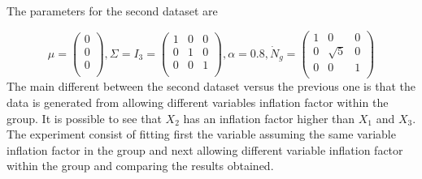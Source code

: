 \documentclass[
]{article}
\newenvironment{Shaded}{\begin{snugshade}}{\end{snugshade}}
\newcommand{\AttributeTok}[1]{\textcolor[rgb]{0.77,0.63,0.00}{#1}}
\newcommand{\CommentTok}[1]{\textcolor[rgb]{0.56,0.35,0.01}{\textit{#1}}}
\newcommand{\ControlFlowTok}[1]{\textcolor[rgb]{0.13,0.29,0.53}{\textbf{#1}}}
\newcommand{\DecValTok}[1]{\textcolor[rgb]{0.00,0.00,0.81}{#1}}
\newcommand{\FunctionTok}[1]{\textcolor[rgb]{0.00,0.00,0.00}{#1}}
\newcommand{\NormalTok}[1]{#1}
\newcommand{\SpecialCharTok}[1]{\textcolor[rgb]{0.00,0.00,0.00}{#1}}
\newcommand{\StringTok}[1]{\textcolor[rgb]{0.31,0.60,0.02}{#1}}
\begin{document}
The parameters for the second dataset are

\[
\mu = \begin{pmatrix} 0 \\ 0 \\ 0\\  \end{pmatrix} , \Sigma = I_{3} = \begin{pmatrix} 1 & 0 & 0  \\ 0 & 1 & 0  \\ 0 & 0 & 1   \\ \end{pmatrix}, \alpha = 0.8, \dot{N}_{g} = \begin{pmatrix} 1 & 0 & 0 \\ 0 & \sqrt{5} & 0  \\ 0 & 0 & 1  \\  \end{pmatrix}
\] The main different between the second dataset versus the previous one
is that the data is generated from allowing different variables
inflation factor within the group. It is possible to see that \(X_{2}\)
has an inflation factor higher than \(X_{1}\) and \(X_{3}\). The
experiment consist of fitting first the variable assuming the same
variable inflation factor in the group and next allowing different
variable inflation factor within the group and comparing the results
obtained.

\begin{Shaded}
\end{Shaded}
\end{document}

